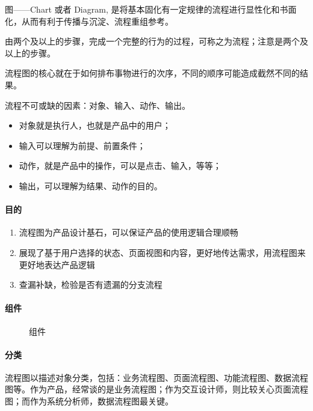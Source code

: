 \documentclass[letterpaper,11pt,english]{sphinxmanual}
\begin{document}
图——Chart 或者 Diagram,
是将基本固化有一定规律的流程进行显性化和书面化，从而有利于传播与沉淀、流程重组参考。

由两个及以上的步骤，完成一个完整的行为的过程，可称之为流程；注意是两个及以上的步骤。

流程图的核心就在于如何排布事物进行的次序，不同的顺序可能造成截然不同的结果。

流程不可或缺的因素：对象、输入、动作、输出。
\begin{itemize}
\item {} 
对象就是执行人，也就是产品中的用户；

\item {} 
输入可以理解为前提、前置条件；

\item {} 
动作，就是产品中的操作，可以是点击、输入，等等；

\item {} 
输出，可以理解为结果、动作的目的。

\end{itemize}


\paragraph{目的}
\label{\detokenize{chapter_skill/flow_chart:id3}}\begin{enumerate}
%
\item {} 
流程图为产品设计基石，可以保证产品的使用逻辑合理顺畅

\item {} 
展现了基于用户选择的状态、页面视图和内容，更好地传达需求，用流程图来更好地表达产品逻辑

\item {} 
查漏补缺，检验是否有遗漏的分支流程

\end{enumerate}


\paragraph{组件}
\label{\detokenize{chapter_skill/flow_chart:id4}}
\begin{figure}[H]
\centering
\capstart

\noindent{}
\caption{组件}\label{\detokenize{chapter_skill/flow_chart:id16}}\end{figure}


\paragraph{分类}
\label{\detokenize{chapter_skill/flow_chart:id5}}
流程图以描述对象分类，包括：业务流程图、页面流程图、功能流程图、数据流程图等。作为产品，经常谈的是业务流程图；作为交互设计师，则比较关心页面流程图；而作为系统分析师，数据流程图最关键。
%
\begin{footnote}[196]\sphinxAtStartFootnote
{}
%
\end{footnote}
\end{document}
